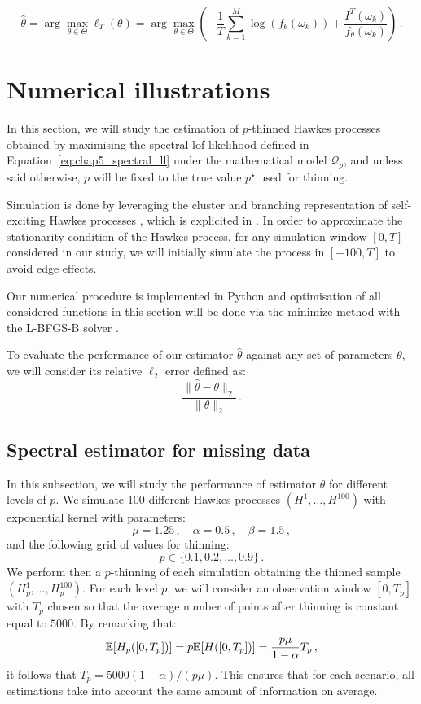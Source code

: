     \[
        \hat \theta = \arg\max_{\theta \in \Theta} \ell_T (\theta)
        = \arg\max_{\theta \in \Theta}  \left(-\frac{1}{T}\sum_{k=1}^{M}{\log(f_\theta (\omega_k)) + \frac{I^T(\omega_k)}{f_\theta(\omega_k)}}\right)\,.
    \]

\section{Numerical illustrations}
    In this section, we will study the estimation of $p$-thinned Hawkes processes obtained by maximising the spectral lof-likelihood defined in Equation~\eqref{eq:chap5_spectral_ll} under the mathematical model $\mathcal{Q}_p$,
    and unless said otherwise, $p$ will be fixed to the true value $p^\star$ used for thinning.

    Simulation is done by leveraging the cluster and branching representation of self-exciting Hawkes processes \parencite{Hawkes1974},
    which is explicited in \textcite[Algorithm 2]{Moller2005}.
    In order to approximate the stationarity condition of the Hawkes process,
    for any simulation window $[0,T]$ considered in our study, 
    we will initially simulate the process in $[-100, T]$ to avoid edge effects.

    Our numerical procedure is implemented in \textrm{Python} and optimisation of all considered functions in this section will be done via the \textrm{minimize} method with the L-BFGS-B solver \parencite{Byrd1995}.

    To evaluate the performance of our estimator $\hat\theta$ against any set of parameters $\theta$,
    we will consider its relative $\ell_2$ error defined as:
    \[\frac{\|\hat \theta - \theta\|_2}{\|\theta\|_2}\,.\]

    \subsection{Spectral estimator for missing data}\label{sec:chap5_missing_numerical}

    In this subsection, we will study the performance of estimator $\hat\theta$ for different levels of $p$.
    We simulate 100 different Hawkes processes $(H^1,\ldots, H^{100})$ with exponential kernel with parameters:
    \[\mu = 1.25\,,\quad \alpha = 0.5\,,\quad \beta = 1.5\,,\]
    and the following grid of values for thinning:
    \[p\in\{0.1, 0.2, \ldots, 0.9\}\,.\]
    We perform then a $p$-thinning of each simulation obtaining the thinned sample $(H_p^1, \ldots, H_p^{100})$.
    For each level $p$, 
    we will consider an observation window $[0,T_p]$ with $T_p$ chosen so that the average number of points after thinning is constant equal to $5000$.
    By remarking that:
    \[{\mathbb E}[H_p([0, T_p])] = p{\mathbb E}[H([0,T_p])] = \frac{ p \mu }{1-\alpha} T_p\,,\]
    it follows that $T_p = 5000 (1-\alpha) / (p \mu)$.
    This ensures that for each scenario, all estimations take into account the same amount of information on average.

